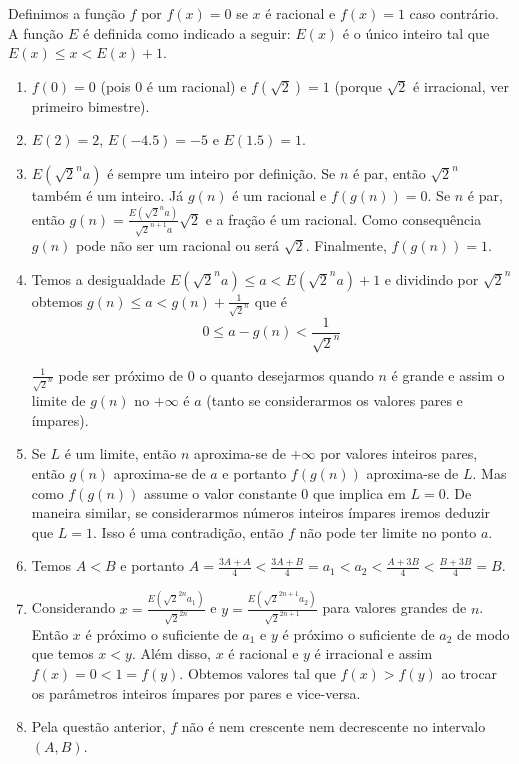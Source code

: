 Definimos a função $f$ por $f(x) = 0$ se $x$ é racional
e $f(x) = 1$ caso contrário.
A função $E$ é definida como indicado a seguir:
$E(x)$ é o único inteiro tal que $E(x) \leq x < E(x) + 1$.

\begin{enumerate}
\item $f(0) = 0$ (pois $0$ é um racional)
  e $f(\sqrt{2}) = 1$
  (porque $\sqrt{2}$ é irracional, ver primeiro bimestre).
\item $E(2) = 2$, $E(-4.5) = -5$ e $E(1.5) = 1$.
\item $E(\sqrt{2}^n a)$ é sempre um inteiro por definição.
  Se $n$ é par, então $\sqrt{2}^n$ também é um inteiro.
  Já $g(n)$ é um racional e $f(g(n)) = 0$.
  Se $n$ é par,
  então $g(n) = \frac{E(\sqrt{2}^n a)}{\sqrt{2}^{n+1} a} \sqrt{2}$
  e a fração é um racional.
  Como consequência $g(n)$ pode não ser um racional ou será $\sqrt{2}$.
  Finalmente, $f(g(n)) = 1$.
\item Temos a desigualdade $E(\sqrt{2}^n a) \leq a < E(\sqrt{2}^n a) + 1$
  e dividindo por $\sqrt{2}^n$ obtemos
  $g(n) \leq a < g(n) + \frac{1}{\sqrt{2}^n}$ que é
  $$0 \leq a - g(n) < \frac{1}{\sqrt{2}^n}$$

  $\frac{1}{\sqrt{2}^n}$ pode ser próximo de $0$ o quanto desejarmos
  quando $n$ é grande e assim o limite de $g(n)$ no $+\infty$ é $a$
  (tanto se considerarmos os valores pares e ímpares).

\item Se $L$ é um limite, então $n$ aproxima-se de $+\infty$ por valores
  inteiros pares, então $g(n)$ aproxima-se de $a$ e portanto $f(g(n))$
  aproxima-se de $L$.
  Mas como $f(g(n))$ assume o valor constante $0$ que implica em $L = 0$.
  De maneira similar, se considerarmos números inteiros ímpares iremos deduzir
  que $L = 1$.
  Isso é uma contradição, então $f$ não pode ter limite no ponto $a$.
\item Temos $A<B$ e portanto
  $A = \frac{3A+A}{4} < \frac{3A+B}{4} = a_1 < a_2 < 
  \frac{A+3B}{4} < \frac{B+3B}{4} = B$.

\item Considerando $x = \frac{E(\sqrt{2}^{2n} a_1)}{\sqrt{2}^{2n}}$ e
  $y = \frac{E(\sqrt{2}^{2n+1} a_2)}{\sqrt{2}^{2n+1}}$
  para valores grandes de $n$.
  Então $x$ é próximo o suficiente de $a_1$ e
  $y$ é próximo o suficiente de $a_2$
  de modo que temos $x < y$.
  Além disso, $x$ é racional e $y$ é irracional
  e assim $f(x) = 0 < 1 = f(y)$.
  Obtemos valores tal que $f(x) > f(y)$ ao trocar os parâmetros inteiros
  ímpares por pares e vice-versa.
\item Pela questão anterior, $f$ não é nem crescente nem decrescente no
  intervalo $(A, B)$.
\end{enumerate}


